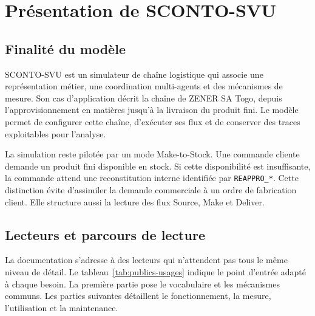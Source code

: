 \chapter{Présentation de SCONTO-SVU}
\label{chap:presentation}

\section{Finalité du modèle}

SCONTO-SVU est un simulateur de chaîne logistique qui associe une représentation métier, une coordination multi-agents et des mécanismes de mesure. Son cas d'application décrit la chaîne de ZENER SA Togo, depuis l'approvisionnement en matières jusqu'à la livraison du produit fini. Le modèle permet de configurer cette chaîne, d'exécuter ses flux et de conserver des traces exploitables pour l'analyse.

La simulation reste pilotée par un mode Make-to-Stock. Une commande cliente demande un produit fini disponible en stock. Si cette disponibilité est insuffisante, la commande attend une reconstitution interne identifiée par \texttt{REAPPRO\_*}. Cette distinction évite d'assimiler la demande commerciale à un ordre de fabrication client. Elle structure aussi la lecture des flux Source, Make et Deliver.



\section{Lecteurs et parcours de lecture}

La documentation s'adresse à des lecteurs qui n'attendent pas tous le même niveau de détail. Le tableau~\ref{tab:publics-usages} indique le point d'entrée adapté à chaque besoin. La première partie pose le vocabulaire et les mécanismes communs. Les parties suivantes détaillent le fonctionnement, la mesure, l'utilisation et la maintenance.

